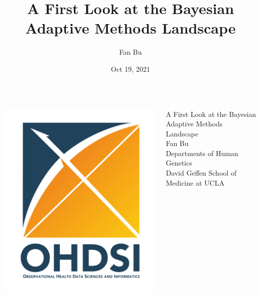 \documentclass[11pt
,fragile=singleslide
,xcolor=dvipsnames
]{beamer}
\title[
Bayesian Adaptive Methods Review
]
{
A First Look at the Bayesian Adaptive Methods Landscape
}
\subtitle
{} %
\author{Fan Bu}
\institute[UCLA] %
{
	Departments of Human Genetics \\
	David Geffen School of Medicine at UCLA
}
\date{Oct 19, 2021}
\begin{document}
	
	\begin{frame}
		\begin{columns}
			\begin{column}{0.33\textwidth}
				\includegraphics[width=1.0\textwidth]{figures/logo_title_page}
			\end{column}
			\begin{column}{0.66\textwidth}
				\begin{center}
					{\LARGE
						A First Look at the Bayesian Adaptive Methods Landscape } \\[2em]
					
						Fan Bu \\[1em]
						Departments of Human Genetics \\
						David Geffen School of Medicine at UCLA
				\end{center}
			\end{column}
		\end{columns}
		\vspace{1em}
		\vspace{1em}
		
	\end{frame}
	
\end{document}
